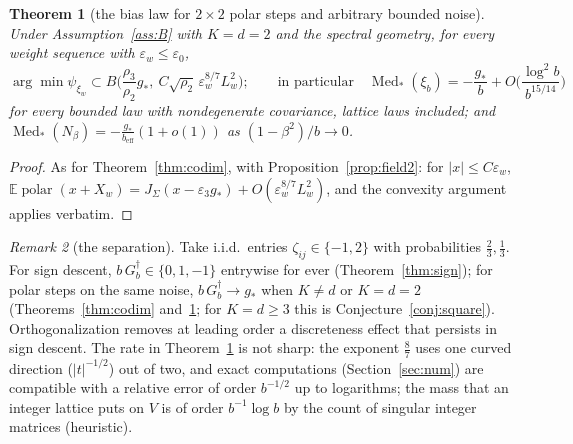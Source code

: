 \documentclass[10pt]{article}
\newtheorem{theorem}{Theorem}
\theoremstyle{definition}
\theoremstyle{remark}
\newtheorem{remark}[theorem]{Remark}
\newcommand{\E}{\mathbb{E}}
\newcommand{\polar}{\operatorname{polar}}
\newcommand{\Med}{\operatorname{Med}}
\newcommand{\st}{\dagger}
\newcommand{\ew}{\varepsilon_w}
\newcommand{\Lw}{L_w}
\begin{document}
\begin{theorem}[the bias law for $2\times2$ polar steps and arbitrary bounded noise]\label{thm:square}
Under Assumption~\ref{ass:B} with $K=d=2$ and the spectral geometry, for every weight sequence with $\ew\le\varepsilon_0$,
\[
\arg\min\psi_{\xi_w}\subset B\Big(\frac{\rho_3}{\rho_2}g_\ast,\ C\sqrt{\rho_2}\,\ew^{8/7}\Lw^2\Big);\qquad\text{in particular}\quad
\Med_\ast(\xi_b)=-\frac{g_\ast}b+O\Big(\frac{\log^2b}{b^{15/14}}\Big)
\]
for every bounded law with nondegenerate covariance, lattice laws included; and
$\Med_\ast(N_\beta)=-\frac{g_\ast}{b_{\mathrm{eff}}}(1+o(1))$ as $(1-\beta^2)/b\to0$.
\end{theorem}
\begin{proof}
As for Theorem~\ref{thm:codim}, with Proposition~\ref{prop:field2}: for $|x|\le C\ew$,
$\E\polar(x+X_w)=J_\Sigma(x-\varepsilon_3g_\ast)+O(\ew^{8/7}\Lw^2)$, and the convexity argument applies verbatim.
\end{proof}

\begin{remark}[the separation]\label{rem:sep}
Take i.i.d.\ entries $\zeta_{ij}\in\{-1,2\}$ with probabilities $\frac23,\frac13$. For sign descent,
$b\,G^\st_b\in\{0,1,-1\}$ entrywise for ever (Theorem~\ref{thm:sign}); for polar steps on the same noise,
$b\,G_b^\st\to g_\ast$ when $K\ne d$ or $K=d=2$ (Theorems~\ref{thm:codim} and~\ref{thm:square}; for $K=d\ge3$ this is Conjecture~\ref{conj:square}). Orthogonalization removes at leading order a
discreteness effect that persists in sign descent. The rate in Theorem~\ref{thm:square} is not sharp: the exponent
$\frac87$ uses one curved direction ($|t|^{-1/2}$) out of two, and exact computations (Section~\ref{sec:num}) are
compatible with a relative error of order $b^{-1/2}$ up to logarithms; the mass that an integer lattice puts on $V$ is
of order $b^{-1}\log b$ by the count of singular integer matrices \cite{katznelson} (heuristic).
\end{remark}
\end{document}
